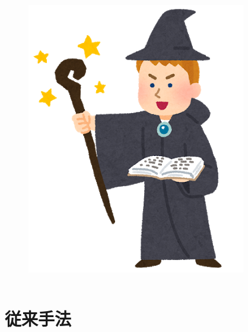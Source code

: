 \begin{frame}
\begin{columns}
\begin{column}{0.5\textwidth}
      \begin{figure}[h]
        \includegraphics[height=0.4\textheight]{img/bob.png}
      \end{figure}
    \end{column}
  \end{columns}
\end{frame}

\section{従来手法}

\newcommand{\facesize}{1cm}

